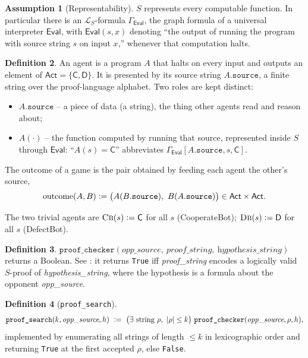 \documentclass[11pt]{article}
\theoremstyle{definition}
\newtheorem{definition}{Definition}[section]
\newtheorem{assumption}[definition]{Assumption}
\theoremstyle{plain}
\theoremstyle{remark}
\newcommand{\Eval}{\mathsf{Eval}}
\newcommand{\source}{\mathtt{.source}}
\newcommand{\Cact}{\mathsf{C}}
\newcommand{\Dact}{\mathsf{D}}
\newcommand{\Act}{\mathsf{Act}}
\newcommand{\pc}{\texttt{proof\_checker}}
\newcommand{\ps}{\texttt{proof\_search}}
\newcommand{\defeq}{\vcentcolon=}
\begin{document}
\begin{assumption}[Representability]\label{ass:repr}
$S$ represents every computable function. In particular there is an
$\mathcal{L}_S$-formula $\Gamma_{\mathsf{Eval}}$, the graph formula of a universal
interpreter $\mathsf{Eval}$, with $\mathsf{Eval}(s,x)$ denoting ``the output of running the
program with source string $s$ on input $x$,'' whenever that computation halts.
\end{assumption}





\begin{definition}\label{def:agent}
An agent is a program $A$ that halts on every input and outputs an element of $\Act=\{\Cact,\Dact\}$. It is presented by its source string $A\source$, a finite string over the proof-language alphabet. Two roles are kept distinct:
\begin{itemize}[leftmargin=1.4em]
\item $A\source$ -- a piece of data (a string), the thing other agents read and reason about;
\item $A(\cdot)$ -- the function computed by running that source, represented inside $S$ through $\Eval$: ``$A(s)=\Cact$'' abbreviates $\Gamma_{\Eval}[A\source, s, \Cact]$.
\end{itemize}
The outcome of a game is the pair obtained by feeding each agent the other's source,
\[
\mathrm{outcome}(A,B)\defeq\big(A(B\source),\ B(A\source)\big)\in\Act\times\Act .
\]
\end{definition}



The two trivial agents are $\textsc{Cb}(s)\defeq\Cact$ for all $s$ (CooperateBot); $\textsc{Db}(s)\defeq\Dact$ for all $s$ (DefectBot).

\begin{definition}
    $\pc(\textit{opp\_source},\ \textit{proof\_string},\ \textit{hypothesis\_string})$ returns a Boolean. See \cite[\S2.1]{osgt2022}: it returns \texttt{True} iff \emph{proof\_string} encodes a logically valid $S$-proof of \emph{hypothesis\_string}, where the hypothesis is a formula about the opponent \emph{opp\_source}.
\end{definition}







\begin{definition}[\ps]\label{def:ps}
\[
\ps(k,\textit{opp\_source},h)\ \defeq\ \big(\exists \text{ string }\rho,\ |\rho|\le k\big)\ \pc(\textit{opp\_source},\rho,h),
\]
implemented by enumerating all strings of length $\le k$ in lexicographic order and returning \texttt{True} at the first accepted $\rho$, else \texttt{False}.
\end{definition}
\end{document}
